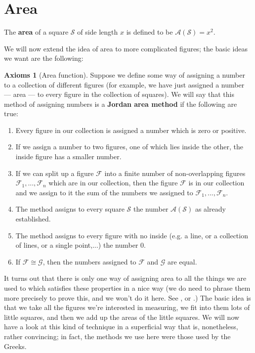 \documentclass[a4paper]{report}
\theoremstyle{definition}
\newtheorem{axs}[thm]{Axioms}
\newcommand{\df}[1]{\textbf{#1}\index{#1}}
\begin{document}
  \section{Area}
  The \df{area} of a square $ \mathscr{S} $ of side length $ x $ is defined to be $ \mathcal{A}(\mathscr{S}) = x^2 $.

  We will now extend the idea of area to more complicated figures; the basic ideas we want are the following:
  \begin{axs}[Area function]\label{defn:area}
    Suppose we define some way of assigning a number to a collection of different figures (for example, we have just assigned a
    number --- area --- to every figure in the collection of squares). We will say that this method of assigning numbers is a \df{Jordan
    area method} if the following are true:
    \begin{enumerate}
      \item Every figure in our collection is assigned a number which is zero or positive.
      \item If we assign a number to two figures, one of which lies inside the other, the inside figure has a smaller number.
      \item If we can split up a figure $ \mathscr{F} $ into a finite number of non-overlapping figures $ \mathscr{F}_1, ..., \mathscr{F}_n $
            which are in our collection, then the figure $ \mathscr{F} $ is in our collection and we assign to it the sum of the
            numbers we assigned to $ \mathscr{F}_1, ..., \mathscr{F}_n $.
      \item The method assigns to every square $ \mathscr{S} $ the number $ \mathcal{A}(\mathscr{S}) $ as already established.
      \item The method assigns to every figure with no inside (e.g. a line, or a collection of lines, or a single point,...) the number 0.
      \item If $ \mathscr{F} \cong \mathscr{G} $, then the numbers assigned to $ \mathscr{F} $ and $ \mathscr{G} $ are equal.
    \end{enumerate}
  \end{axs}
  It turns out that there is only one way of assigning area to all the things we are used to which satisfies these properties in a nice
  way (we do need to phrase them more precisely to prove this, and we won't do it here. See \autocite[chapter 8]{lands}, or \autocite[chapter 5]{hartshorne}.)
  The basic idea is that we take all the figures we're interested in measuring, we fit into them lots of little squares, and then we add up the areas of the
  little squares. We will now have a look at this kind of technique in a superficial way that is, nonetheless, rather convincing; in fact, the methods
  we use here were those used by the Greeks.
\end{document}
